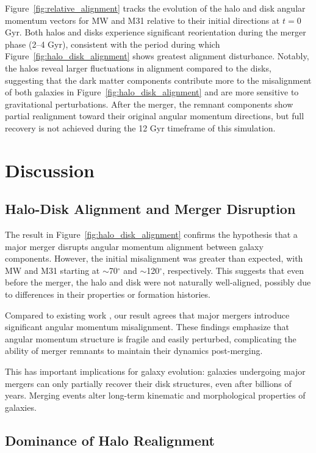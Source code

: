 \documentclass[twocolumn]{aastex631}
\begin{document}
Figure~\ref{fig:relative_alignment} tracks the evolution of the halo and disk angular momentum vectors for MW and M31 relative to their initial directions at $t = 0$ Gyr. Both halos and disks experience significant reorientation during the merger phase (2--4 Gyr), consistent with the period during which Figure~\ref{fig:halo_disk_alignment} shows greatest alignment disturbance. Notably, the halos reveal larger fluctuations in alignment compared to the disks, suggesting that the dark matter components contribute more to the misalignment of both galaxies in Figure~\ref{fig:halo_disk_alignment} and are more sensitive to gravitational perturbations. After the merger, the remnant components show partial realignment toward their original angular momentum directions, but full recovery is not achieved during the 12 Gyr timeframe of this simulation.


\section{Discussion}

\subsection{Halo-Disk Alignment and Merger Disruption}

The result in Figure~\ref{fig:halo_disk_alignment} confirms the hypothesis that a major merger disrupts angular momentum alignment between galaxy components. However, the initial misalignment was greater than expected, with MW and M31 starting at $\sim$70$^\circ$ and $\sim$120$^\circ$, respectively. This suggests that even before the merger, the halo and disk were not naturally well-aligned, possibly due to differences in their properties or formation histories.


Compared to existing work \citep{Chua2019}, our result agrees that major mergers introduce significant angular momentum misalignment. These findings emphasize that angular momentum structure is fragile and easily perturbed, complicating the ability of merger remnants to maintain their dynamics post-merging.


This has important implications for galaxy evolution: galaxies undergoing major mergers can only partially recover their disk structures, even after billions of years. Merging events alter long-term kinematic and morphological properties of galaxies.

\subsection{Dominance of Halo Realignment}
\end{document}
